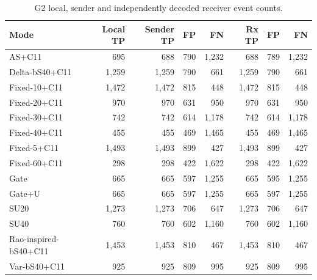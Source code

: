 \begin{small}\setlength{\tabcolsep}{4pt}\begin{longtable}{lrrrrrrr}\caption{G2 local, sender and independently decoded receiver event counts.}\label{tab:transfercounts}\\\toprule Mode & Local TP & Sender TP & FP & FN & Rx TP & FP & FN \\\midrule\endhead
AS+C11 & 695 & 688 & 790 & 1,232 & 688 & 789 & 1,232 \\
Delta-bS40+C11 & 1,259 & 1,259 & 790 & 661 & 1,259 & 790 & 661 \\
Fixed-10+C11 & 1,472 & 1,472 & 815 & 448 & 1,472 & 815 & 448 \\
Fixed-20+C11 & 970 & 970 & 631 & 950 & 970 & 631 & 950 \\
Fixed-30+C11 & 742 & 742 & 614 & 1,178 & 742 & 614 & 1,178 \\
Fixed-40+C11 & 455 & 455 & 469 & 1,465 & 455 & 469 & 1,465 \\
Fixed-5+C11 & 1,493 & 1,493 & 899 & 427 & 1,493 & 899 & 427 \\
Fixed-60+C11 & 298 & 298 & 422 & 1,622 & 298 & 422 & 1,622 \\
Gate & 665 & 665 & 597 & 1,255 & 665 & 595 & 1,255 \\
Gate+U & 665 & 665 & 597 & 1,255 & 665 & 597 & 1,255 \\
SU20 & 1,273 & 1,273 & 706 & 647 & 1,273 & 706 & 647 \\
SU40 & 760 & 760 & 602 & 1,160 & 760 & 602 & 1,160 \\
Rao-inspired-bS40+C11 & 1,453 & 1,453 & 810 & 467 & 1,453 & 810 & 467 \\
Var-bS40+C11 & 925 & 925 & 809 & 995 & 925 & 809 & 995 \\
\bottomrule\end{longtable}\end{small}
